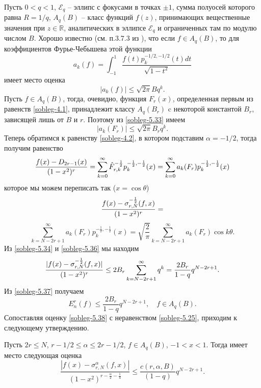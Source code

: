 Пусть $0<q<1$, $\mathcal{ E}_q$ -- эллипс с фокусами в точках $\pm1$, сумма полуосей которого равна $R=1/q$, $A_q(B)$ -- класс функций $f(z)$, принимающих вещественные значения при $z\in\mathbb{R}$,  аналитических в эллипсе $\mathcal{ E}_q$ и ограниченных там по модулю числом $B$. Хорошо известно  (см. п.3.7.3 из \cite{sobleg-Timan}), что если $f\in A_q(B)$, то для коэффициентов Фурье-Чебышева этой функции
\begin{equation}\label{sobleg-5.32}
 a_k(f)=\int_{-1}^1\frac{f(t)p_k^{-1/2,-1/2}(t)dt}{\sqrt{1-t^2}}
 \end{equation}
имеет место оценка
\begin{equation}\label{sobleg-5.33}
 |a_k(f)|\le\sqrt{2\pi}Bq^k.
 \end{equation}
Пусть $f\in A_q(B)$, тогда, очевидно, функция $F_r(x)$, определенная первым из равенств \eqref{sobleg-4.1},  принадлежит классу $A_q(B_r)$ c некоторой константой $B_r$, зависящей лишь от $B$  и $r$. Поэтому из \eqref{sobleg-5.33}
имеем
\begin{equation}\label{sobleg-5.34}
 |a_k(F_r)|\le\sqrt{2\pi}B_rq^k.
 \end{equation}
Теперь обратимся к равенству \eqref{sobleg-4.2}, в котором подставим  $\alpha=-1/2$, тогда получим равенство
 \begin{equation}\label{sobleg-5.35}
{f(x)-D_{2r-1}(x)\over(1-x^2)^r}=
 \sum_{k=0}^\infty \hat F_{r,k}^{-\frac12} p_{k}^{-\frac12,-\frac12}(x)=
 \sum_{k=0}^\infty a_k(F_r) p_{k}^{-\frac12,-\frac12}(x)
\end{equation}
которое мы можем переписать так ($x=\cos\theta$)
$$
{f(x)-\sigma_{r,N}^{-\frac12}(f,x)\over(1-x^2)^r}=
$$
\begin{equation}\label{sobleg-5.36}
  \sum_{k=N-2r+1}^\infty a_k(F_r) p_{k}^{-\frac12,-\frac12}(x)=\sqrt{\frac2\pi}
  \sum_{k=N-2r+1}^\infty a_k(F_r) \cos k\theta.
\end{equation}
Из \eqref{sobleg-5.34} и \eqref{sobleg-5.36} мы находим
\begin{equation}\label{sobleg-5.37}
 {|f(x)-\sigma_{r,N}^{-\frac12}(f,x)|\over(1-x^2)^r}\le 2B_r\sum_{k=N-2r+1}^\infty q^k=
 \frac{2B_r}{1-q}q^{N-2r+1}.
  \end{equation}
Из \eqref{sobleg-5.37} получаем
\begin{equation}\label{sobleg-5.38}
 E_{n}^r(f)\le \frac{2B_r}{1-q}q^{N-2r+1},\quad f\in A_q(B).
  \end{equation}
Сопоставляя оценку \eqref{sobleg-5.38} с неравенством \eqref{sobleg-5.25}, приходим к следующему утверждению.
\begin{corollary}\label{soblegcor4}
Пусть $2r\le N$, $r-1/2\le \alpha\le 2r-1/2$, $f\in A_q(B)$, $-1<x<1$. Тогда имеет место следующая оценка
\begin{equation}\label{sobleg-5.39}
 \frac{|f(x)-\sigma_{r,N}^\alpha(f,x)|}
{(1-x^2)^{r-\frac{\alpha}{2}-\frac14}}\le\frac{c(r,\alpha, B)}{(1-q)}q^{N-2r+1}.
 \end{equation}
\end{corollary}



